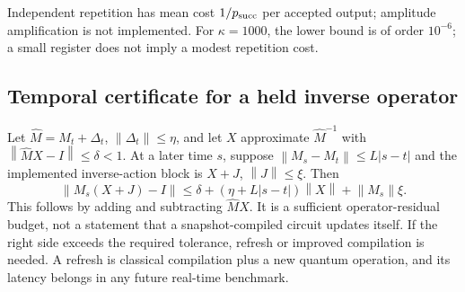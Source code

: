 \documentclass[10pt]{article}
\newcommand{\norm}[1]{\left\lVert #1\right\rVert}
\begin{document}
Independent repetition has mean cost $1/p_{\rm succ}$ per accepted output; amplitude amplification is not implemented. For $\kappa=1000$, the lower bound is of order $10^{-6}$; a small register does not imply a modest repetition cost.




\subsection{Temporal certificate for a held inverse operator}
Let $\widehat M=M_t+\Delta_t$, $\norm{\Delta_t}\le\eta$, and let $X$ approximate $\widehat M^{-1}$ with $\norm{\widehat M X-I}\le\delta<1$. At a later time $s$, suppose $\norm{M_s-M_t}\le L|s-t|$ and the implemented inverse-action block is $X+J$, $\norm J\le\xi$. Then
\begin{equation}\label{eq:held}
\norm{M_s(X+J)-I}\le\delta+(\eta+L|s-t|)\norm X+\norm{M_s}\xi.
\end{equation}
This follows by adding and subtracting $\widehat M X$. It is a sufficient operator-residual budget, not a statement that a snapshot-compiled circuit updates itself. If the right side exceeds the required tolerance, refresh or improved compilation is needed. A refresh is classical compilation plus a new quantum operation, and its latency belongs in any future real-time benchmark.
\end{document}
